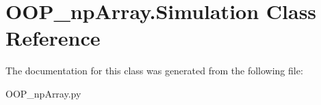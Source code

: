 \hypertarget{class_o_o_p__np_array_1_1_simulation}{}\section{O\+O\+P\+\_\+np\+Array.\+Simulation Class Reference}
\label{class_o_o_p__np_array_1_1_simulation}


The documentation for this class was generated from the following file\+:\begin{DoxyCompactItemize}
\item 
O\+O\+P\+\_\+np\+Array.\+py\end{DoxyCompactItemize}
